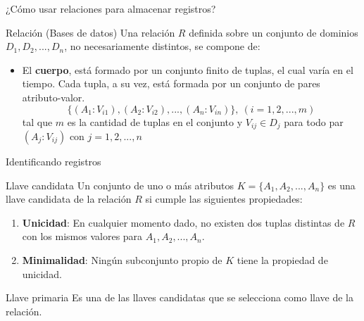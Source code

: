 \begin{frame}{¿C\'omo usar relaciones para almacenar registros?}
    \begin{block}{Relaci\'on (Bases de datos)}
        Una relaci\'on $R$ definida sobre un conjunto de dominios
        $D_1, D_2, ..., D_n$, no necesariamente distintos, se compone de:
        \begin{itemize}
            \item El \textbf{cuerpo}, est\'a formado por un
            conjunto finito de tuplas, el cual var\'ia en el tiempo.
            Cada tupla, a su vez, est\'a formada por un conjunto de pares
            atributo-valor.
            $$
                \{(A_1:V_{i1}),(A_2:V_{i2}),...,(A_n:V_{in})\}, \ (i=1,2,...,m)
            $$
            tal que $m$ es la cantidad de tuplas en el conjunto y 
            $V_{ij} \in D_j$ para todo par $(A_j:V_{ij})$ con $j=1,2,...,n$
            
        \end{itemize}
        \vspace{3mm}

    \end{block}
\end{frame}


\begin{frame}{Identificando registros}
    \begin{block}{Llave candidata}
        Un conjunto de uno o m\'as atributos $K = \{A_1,A_2,...,A_n\}$ es una llave candidata
        de la relaci\'on $R$ si cumple las siguientes propiedades:
        \begin{enumerate}
            \item \textbf{Unicidad}: En cualquier momento dado, no existen dos tuplas
            distintas de $R$ con los mismos valores para $A_1,A_2,...,A_n$.
            \item \textbf{Minimalidad}: Ning\'un subconjunto propio de $K$ tiene la
            propiedad de unicidad.
        \end{enumerate}
    \end{block}

    \begin{block}{Llave primaria}
        Es una de las llaves candidatas que se selecciona
        como llave de la relaci\'on.
    \end{block}
    
\end{frame}

